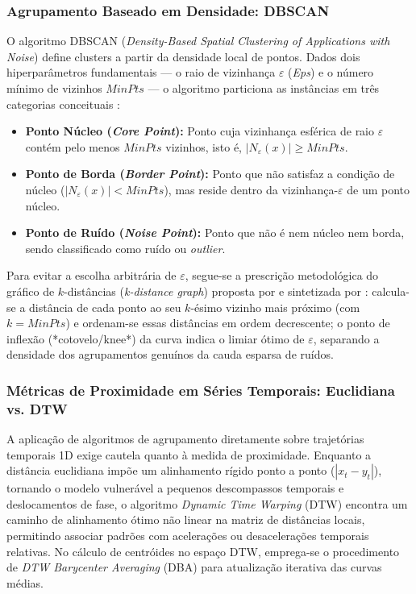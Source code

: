 \subsubsection{Agrupamento Baseado em Densidade: DBSCAN}

O algoritmo DBSCAN (\textit{Density-Based Spatial Clustering of Applications with Noise}) \cite{ester1996density} define clusters a partir da densidade local de pontos. Dados dois hiperparâmetros fundamentais --- o raio de vizinhança $\varepsilon$ (\textit{Eps}) e o número mínimo de vizinhos $MinPts$ --- o algoritmo particiona as instâncias em três categorias conceituais \cite{tan2019introduction}:
\begin{itemize}
    \item \textbf{Ponto Núcleo (\textit{Core Point}):} Ponto cuja vizinhança esférica de raio $\varepsilon$ contém pelo menos $MinPts$ vizinhos, isto é, $|N_\varepsilon(x)| \ge MinPts$.
    \item \textbf{Ponto de Borda (\textit{Border Point}):} Ponto que não satisfaz a condição de núcleo ($|N_\varepsilon(x)| < MinPts$), mas reside dentro da vizinhança-$\varepsilon$ de um ponto núcleo.
    \item \textbf{Ponto de Ruído (\textit{Noise Point}):} Ponto que não é nem núcleo nem borda, sendo classificado como ruído ou \textit{outlier}.
\end{itemize}
Para evitar a escolha arbitrária de $\varepsilon$, segue-se a prescrição metodológica do gráfico de $k$-distâncias (\textit{k-distance graph}) proposta por \cite{ester1996density} e sintetizada por \cite{tan2019introduction}: calcula-se a distância de cada ponto ao seu $k$-ésimo vizinho mais próximo (com $k = MinPts$) e ordenam-se essas distâncias em ordem decrescente; o ponto de inflexão (*cotovelo/knee*) da curva indica o limiar ótimo de $\varepsilon$, separando a densidade dos agrupamentos genuínos da cauda esparsa de ruídos.

\subsubsection{Métricas de Proximidade em Séries Temporais: Euclidiana vs. DTW}

A aplicação de algoritmos de agrupamento diretamente sobre trajetórias temporais 1D exige cautela quanto à medida de proximidade. Enquanto a distância euclidiana impõe um alinhamento rígido ponto a ponto ($|x_t - y_t|$), tornando o modelo vulnerável a pequenos descompassos temporais e deslocamentos de fase, o algoritmo \textit{Dynamic Time Warping} (DTW) \cite{sakoe1978dynamic} encontra um caminho de alinhamento ótimo não linear na matriz de distâncias locais, permitindo associar padrões com acelerações ou desacelerações temporais relativas. No cálculo de centróides no espaço DTW, emprega-se o procedimento de \textit{DTW Barycenter Averaging} (DBA) para atualização iterativa das curvas médias.

